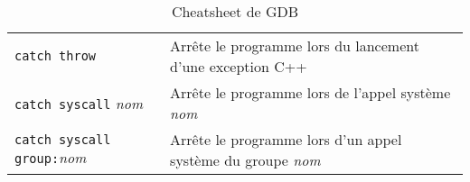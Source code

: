 \begin{table}[H]
\begin{tabular}{lp{9cm}}
		\midrule

		\texttt{catch throw} & Arrête le programme lors du lancement
			d'une exception C++\\
		\texttt{catch syscall} \textit{nom} & Arrête le programme lors de
			l'appel système \textit{nom}\\
		\texttt{catch syscall group:}\textit{nom} & Arrête le programme lors
			d'un appel système du groupe \textit{nom}\\

		\bottomrule
	\end{tabular}
	\caption{Cheatsheet de GDB}
\end{table}
